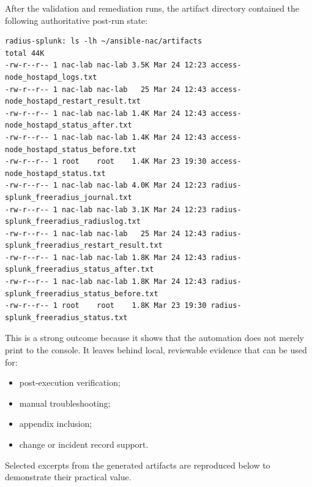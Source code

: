 \documentclass[11pt]{article}
\begin{document}
After the validation and remediation runs, the artifact directory contained the following authoritative post-run state:

\begin{verbatim}
radius-splunk: ls -lh ~/ansible-nac/artifacts
total 44K
-rw-r--r-- 1 nac-lab nac-lab 3.5K Mar 24 12:23 access-node_hostapd_logs.txt
-rw-r--r-- 1 nac-lab nac-lab   25 Mar 24 12:43 access-node_hostapd_restart_result.txt
-rw-r--r-- 1 nac-lab nac-lab 1.4K Mar 24 12:43 access-node_hostapd_status_after.txt
-rw-r--r-- 1 nac-lab nac-lab 1.4K Mar 24 12:43 access-node_hostapd_status_before.txt
-rw-r--r-- 1 root    root    1.4K Mar 23 19:30 access-node_hostapd_status.txt
-rw-r--r-- 1 nac-lab nac-lab 4.0K Mar 24 12:23 radius-splunk_freeradius_journal.txt
-rw-r--r-- 1 nac-lab nac-lab 3.1K Mar 24 12:23 radius-splunk_freeradius_radiuslog.txt
-rw-r--r-- 1 nac-lab nac-lab   25 Mar 24 12:43 radius-splunk_freeradius_restart_result.txt
-rw-r--r-- 1 nac-lab nac-lab 1.8K Mar 24 12:43 radius-splunk_freeradius_status_after.txt
-rw-r--r-- 1 nac-lab nac-lab 1.8K Mar 24 12:43 radius-splunk_freeradius_status_before.txt
-rw-r--r-- 1 root    root    1.8K Mar 23 19:30 radius-splunk_freeradius_status.txt
\end{verbatim}

This is a strong outcome because it shows that the automation does not merely print to the console. It leaves behind local, reviewable evidence that can be used for:

\begin{itemize}
    \item post-execution verification;
    \item manual troubleshooting;
    \item appendix inclusion;
    \item change or incident record support.
\end{itemize}

Selected excerpts from the generated artifacts are reproduced below to demonstrate their practical value.
\end{document}
